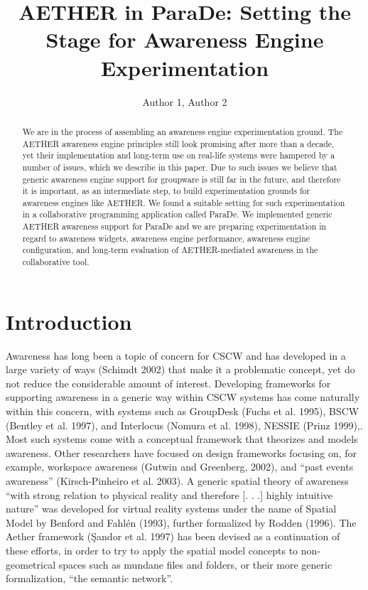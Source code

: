 \documentclass{ecscw2007}
\title{AETHER in ParaDe: Setting the Stage for Awareness Engine Experimentation}
\author{Author 1, Author 2}
\affiliation{Institute 1, Country, Institute 2, Country}
\begin{document}
\maketitle
\thispagestyle{empty}


\begin{abstract}
We are in the process of assembling an awareness engine experimentation ground. The AETHER awareness engine principles still look promising after more than a decade, yet their implementation and long-term use on real-life systems were hampered by a number of issues, which we describe in this paper. Due to such issues we believe that generic awareness engine support for groupware is still far in the future, and therefore it is important, as an intermediate step, to build experimentation grounds for awareness engines like AETHER. We found a suitable setting for such experimentation in a collaborative programming application called ParaDe. We implemented generic AETHER awareness support for ParaDe and we are preparing experimentation in regard to awareness widgets, awareness engine performance, awareness engine configuration, and long-term evaluation of AETHER-mediated awareness in the collaborative tool.
\end{abstract}

\section*{Introduction}
Awareness has long been a topic of concern for CSCW and has developed in a large variety of ways (Schimdt 2002) that make it a problematic concept, yet do not reduce the considerable amount of interest. Developing frameworks for supporting awareness in a generic way within CSCW systems has come naturally within this concern, with systems such as GroupDesk (Fuchs et al. 1995), BSCW (Bentley et al. 1997), and Interlocus (Nomura et al. 1998), NESSIE (Prinz 1999),. Most such systems come with a conceptual framework that theorizes and models awareness. Other researchers have focused on design frameworks focusing on, for example, workspace awareness (Gutwin and Greenberg, 2002), and ``past events awareness'' (Kirsch-Pinheiro et al. 2003). A generic spatial theory of awareness ``with strong relation to physical reality and therefore [. . .] highly intuitive nature'' was developed for virtual reality systems under the name of Spatial Model by Benford and Fahl\'{e}n (1993), further formalized by Rodden (1996). The Aether framework (Şandor et al. 1997) has been devised as a continuation of these efforts, in order to try to apply the spatial model concepts to non-geometrical spaces such as mundane files and folders, or their more generic formalization, ``the semantic network''.  
\end{document}
